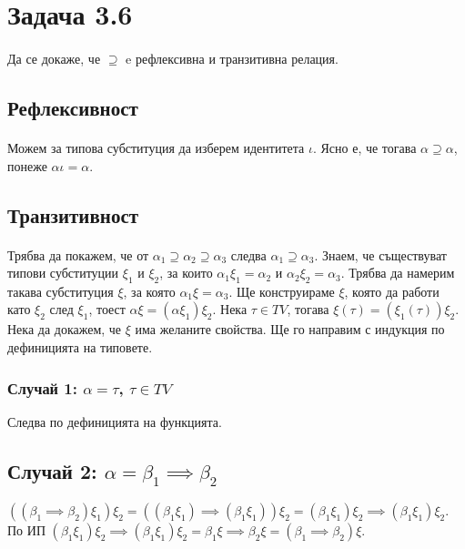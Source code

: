 \documentclass[12pt]{article}
\begin{document}
\newcommand\alphaeq{\mathrel{\stackrel{\makebox[0pt]{\mbox{\normalfont\tiny $\alpha$}}}{=}}}
\newcommand\betaeq{\mathrel{\stackrel{\makebox[0pt]{\mbox{\normalfont\tiny $\beta$}}}{=}}}
\newcommand\betaetaeq{\mathrel{\stackrel{\makebox[0pt]{\mbox{\normalfont\tiny $\beta\eta$}}}{=}}}

\section*{Задача 3.6}
\paragraph*{}
Да се докаже, че $\supseteq$ e рефлексивна и транзитивна релация.
\subsection*{Рефлексивност}
\paragraph*{}
Можем за типова субституция да изберем идентитета $\iota$. Ясно е, че тогава $\alpha \supseteq \alpha$, понеже $\alpha \iota = \alpha$.
\subsection*{Транзитивност}
\paragraph*{}
Трябва да покажем, че от $\alpha_1 \supseteq \alpha_2 \supseteq \alpha_3$ следва $\alpha_1 \supseteq \alpha_3$. Знаем, че съществуват типови субституции $\xi_1$ и $\xi_2$, за които $\alpha_1 \xi_1 = \alpha_2$ и $\alpha_2 \xi_2 = \alpha_3$. Трябва да намерим такава субституция $\xi$, за която $\alpha_1 \xi = \alpha_3$. Ще конструираме $\xi$, която да работи като $\xi_2$ след $\xi_1$, тоест $\alpha \xi = (\alpha \xi_1) \xi_2$. Нека $\tau \in TV$, тогава $\xi(\tau) = (\xi_1(\tau)) \xi_2$. Нека да докажем, че $\xi$ има желаните свойства. Ще го направим с индукция по дефиницията на типовете.
\subsubsection*{Случай 1: $\alpha = \tau$, $\tau \in TV$}
Следва по дефиницията на функцията.
\subsection*{Случай 2: $\alpha = \beta_1 \implies \beta_2$}
$((\beta_1 \implies \beta_2)\xi_1)\xi_2 = ((\beta_1 \xi_1) \implies (\beta_1 \xi_1))\xi_2 = (\beta_1 \xi_1) \xi_2 \implies (\beta_1 \xi_1) \xi_2$. По ИП $(\beta_1 \xi_1) \xi_2 \implies (\beta_1 \xi_1) \xi_2 = \beta_1 \xi \implies \beta_2 \xi = (\beta_1 \implies \beta_2)\xi$.
\end{document}
